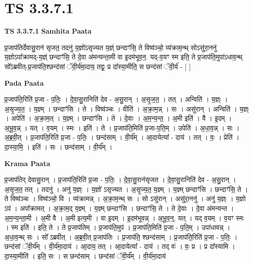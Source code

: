 \documentclass[17pt]{extarticle}
\begin{document}
\section{ TS 3.3.7.1 }

\textbf{TS 3.3.7.1 } \newline
\textbf{Samhita Paata} \newline

प्र॒जाप॑तिर्देवासु॒रान॑ सृजत॒ तदनु॑ य॒ज्ञो॑ऽसृज्यत य॒ज्ञ्ं छन्दाꣳ॑सि॒ ते विष्व॑ञ्चो॒ व्य॑क्राम॒न्थ् सोऽसु॑रा॒ननु॑ य॒ज्ञोऽपा᳚क्रामद्-य॒ज्ञ्ं छन्दाꣳ॑सि॒ ते दे॒वा अ॑मन्यन्ता॒मी वा इ॒दम॑भूव॒न॒. यद्-व॒यꣳ स्म इति॒ ते प्र॒जाप॑ति॒मुपा॑ऽधाव॒न्थ् सो᳚ऽब्रवीत्-प्र॒जाप॑ति॒श्छन्द॑सां ॅवी॒र्य॑मा॒दाय॒ तद्वः॒ प्र दा᳚स्या॒मीति॒ स छन्द॑सां ॅवी॒र्य॑ - [  ] \newline

\textbf{Pada Paata} \newline

प्र॒जाप॑ति॒रिति॑ प्र॒जा - प॒तिः॒ । दे॒वा॒सु॒रानिति॑ देव - अ॒सु॒रान् । अ॒सृ॒ज॒त॒ । तत् । अन्विति॑ । य॒ज्ञ्ः । अ॒सृ॒ज्य॒त॒ । य॒ज्ञ्म् । छन्दाꣳ॑सि । ते । विष्व॑ञ्चः । वीति॑ । अ॒क्रा॒म॒न्न् । सः । असु॑रान् । अन्विति॑ । य॒ज्ञ्ः । अपेति॑ । अ॒क्रा॒म॒त् । य॒ज्ञ्म् । छन्दाꣳ॑सि । ते । दे॒वाः । अ॒म॒न्य॒न्त॒ । अ॒मी इति॑ । वै । इ॒दम् । अ॒भू॒व॒न्न् । यत् । व॒यम् । स्मः । इति॑ । ते । प्र॒जाप॑ति॒मिति॑ प्र॒जा-प॒ति॒म् । उपेति॑ । अ॒धा॒व॒न्न् । सः । अ॒ब्र॒वी॒त् । प्र॒जाप॑ति॒रिति॑ प्र॒जा - प॒तिः॒ । छन्द॑साम् । वी॒र्य᳚म् । आ॒दायेत्या᳚ - दाय॑ । तत् । वः॒ । प्रेति॑ । दा॒स्या॒मि॒ । इति॑ । सः । छन्द॑साम् । वी॒र्य᳚म् ।  \newline


\textbf{Krama Paata} \newline

प्र॒जाप॑तिर् देवासु॒रान् । प्र॒जाप॑ति॒रिति॑ प्र॒जा - प॒तिः॒ । दे॒वा॒सु॒रान॑सृजत । दे॒वा॒सु॒रानिति॑ देव - अ॒सु॒रान् । अ॒सृ॒ज॒त॒ तत् । तदनु॑ । अनु॑ य॒ज्ञ्ः । य॒ज्ञो॑ ऽसृज्यत । अ॒सृ॒ज्य॒त॒ य॒ज्ञ्म् । य॒ज्ञ्म् छन्दाꣳ॑सि । छन्दाꣳ॑सि॒ ते । ते विष्व॑ञ्चः । विष्व॑ञ्चो॒ वि । व्य॑क्रामन्न् । अ॒क्रा॒म॒न्थ् सः । सो ऽसु॑रान् । असु॑रा॒ननु॑ । अनु॑ य॒ज्ञ्ः । य॒ज्ञो ऽप॑ । अपा᳚क्रामत् । अ॒क्रा॒म॒द् य॒ज्ञ्म् । य॒ज्ञ्म् छन्दाꣳ॑सि । छन्दाꣳ॑सि॒ ते । ते दे॒वाः । दे॒वा अ॑मन्यन्त । अ॒म॒न्य॒न्ता॒मी । अ॒मी वै । अ॒मी इत्य॒मी । वा इ॒दम् । इ॒दम॑भूवन्न् । अ॒भू॒व॒न्॒. यत् । यद् व॒यम् । व॒यꣳ स्मः । स्म इति॑ । इति॒ ते । ते प्र॒जाप॑तिम् । प्र॒जाप॑ति॒मुप॑ । प्र॒जाप॑ति॒मिति॑ प्र॒जा - प॒ति॒म् । उपा॑धावन्न् । अ॒धा॒व॒न्थ् सः । सो᳚ ऽब्रवीत् । अ॒ब्र॒वी॒त् प्र॒जाप॑तिः । प्र॒जाप॑ति॒ श्छन्द॑साम् । प्र॒जाप॑ति॒रिति॑ प्र॒जा - प॒तिः॒ । छन्द॑सां ॅवी॒र्य᳚म् । वी॒र्य॑मा॒दाय॑ । आ॒दाय॒ तत् । आ॒दायेत्या᳚ - दाय॑ । तद् वः॑ । वः॒ प्र । प्र दा᳚स्यामि । दा॒स्या॒मीति॑ । इति॒ सः । स छन्द॑साम् । छन्द॑सां ॅवी॒र्य᳚म् । वी॒र्य॑मा॒दाय॑ \newline
\end{document}
